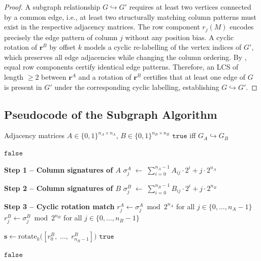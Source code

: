 ﻿\documentclass[12pt,a4paper]{article}
\theoremstyle{plain}
\theoremstyle{definition}
\theoremstyle{remark}
\begin{document}
	\begin{proof}
		A subgraph relationship $G \hookrightarrow G'$ requires at least two
		vertices connected by a common edge, i.e., at least two structurally
		matching column patterns must exist in the respective adjacency matrices.
		The row component $r_j(M)$ encodes precisely the edge pattern of column $j$
		without any position bias.  A cyclic rotation of $\mathbf{r}^B$ by offset
		$k$ models a cyclic re-labelling of the vertex indices of $G'$, which
		preserves all edge adjacencies while changing the column ordering.  By
		, equal row components certify identical edge patterns.
		Therefore, an LCS of length $\geq 2$ between $\mathbf{r}^A$ and a rotation
		of $\mathbf{r}^B$ certifies that at least one edge of $G$ is present in
		$G'$ under the corresponding cyclic labelling, establishing
		$G \hookrightarrow G'$.
	\end{proof}

	\subsection{Pseudocode of the Subgraph Algorithm}

	\begin{algorithm}[H]
		\caption{Subgraph Algorithm$(A,\, B)$}
		\label{alg:subgraph}
		\begin{algorithmic}[1]
			\Require Adjacency matrices $A \in \{0,1\}^{n_A \times n_A}$,
			$B \in \{0,1\}^{n_B \times n_B}$
			\Ensure $\mathtt{true}$ iff $G_A \hookrightarrow G_B$

			\Return $\mathtt{false}$
			\EndIf

			\Statex
			\Statex \textbf{Step 1 -- Column signatures of $A$}
			\State $\sigma_j^A \;\leftarrow\; \sum_{i=0}^{n_A-1} A_{ij} \cdot 2^i
			+ j \cdot 2^{n_A}$
			\EndFor

			\Statex
			\Statex \textbf{Step 2 -- Column signatures of $B$}
			\State $\sigma_j^B \;\leftarrow\; \sum_{i=0}^{n_B-1} B_{ij} \cdot 2^i
			+ j \cdot 2^{n_B}$
			\EndFor

			\Statex
			\Statex \textbf{Step 3 -- Cyclic rotation match}
			\State $r_j^A \leftarrow \sigma_j^A \bmod 2^{n_A}$
			\quad for all $j \in \{0, \ldots, n_A - 1\}$
			\State $r_j^B \leftarrow \sigma_j^B \bmod 2^{n_B}$
			\quad for all $j \in \{0, \ldots, n_B - 1\}$

			\State $\mathbf{s} \leftarrow
			\mathrm{rotate}_k\bigl([r_0^B,\; \ldots,\; r_{n_B-1}^B]\bigr)$
			\Return $\mathtt{true}$
			\EndIf
			\EndFor

			\Return $\mathtt{false}$
		\end{algorithmic}
	\end{algorithm}
\end{document}
